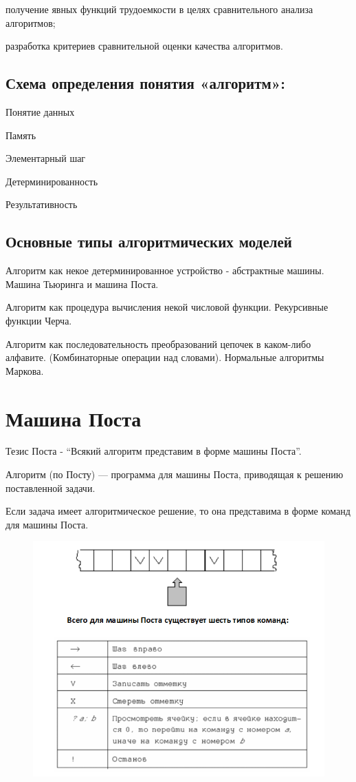 \documentclass{article}
\begin{document}
получение явных функций трудоемкости в целях сравнительного анализа алгоритмов;

разработка критериев сравнительной оценки качества алгоритмов.

\subsection{Схема определения понятия «алгоритм»:}

Понятие данных

Память

Элементарный шаг

Детерминированность

Результативность

\subsection{Основные типы алгоритмических моделей}
Алгоритм как некое детерминированное устройство - абстрактные машины. 
Машина Тьюринга и машина Поста.

Алгоритм как процедура вычисления некой числовой функции. Рекурсивные функции Черча.

Алгоритм как последовательность преобразований цепочек в каком-либо алфавите.
(Комбинаторные операции над словами). Нормальные алгоритмы Маркова.

\section{Машина Поста}

Тезис Поста - “Всякий алгоритм представим в форме машины Поста”.

Алгоритм (по Посту) — программа для машины Поста, приводящая к решению поставленной задачи.

Если задача имеет алгоритмическое решение, то она представима в форме команд для машины Поста.


\begin{figure}
    \centering
    \includegraphics[width=1\linewidth]{Снимок экрана 2025-02-25 090545.png}
\end{figure}
\end{document}
